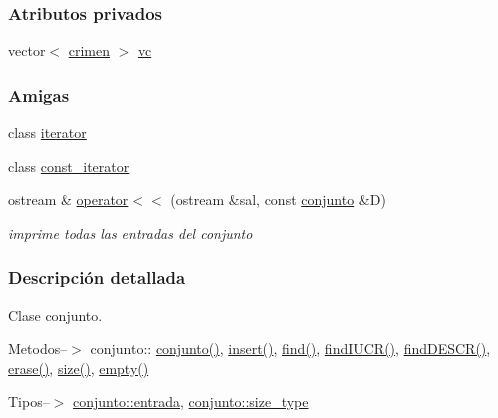 \subsubsection*{Atributos privados}
\begin{DoxyCompactItemize}
\item 
vector$<$ \hyperlink{classcrimen}{crimen} $>$ \hyperlink{classconjunto_aed485e92bb3d8b2c82fc85657947761d}{vc}
\end{DoxyCompactItemize}
\subsubsection*{Amigas}
\begin{DoxyCompactItemize}
\item 
class \hyperlink{classconjunto_a67171474c4da6cc8efe0c7fafefd2b2d}{iterator}
\item 
class \hyperlink{classconjunto_ac220ce1c155db1ac44146c12d178056f}{const\-\_\-iterator}
\item 
ostream \& \hyperlink{classconjunto_ae54b721035471d372f29c0335c42734a}{operator$<$$<$} (ostream \&sal, const \hyperlink{classconjunto}{conjunto} \&D)
\begin{DoxyCompactList}\small\item\em imprime todas las entradas del conjunto \end{DoxyCompactList}\end{DoxyCompactItemize}


\subsubsection{Descripción detallada}
Clase conjunto. 

Metodos--$>$ conjunto\-:\-: \hyperlink{classconjunto_a16d987f42c679efab01748178ba45891}{conjunto()}, \hyperlink{classconjunto_aa65b9f7c4cb9bad6d4e40c1973095930}{insert()}, \hyperlink{classconjunto_a5db0b726eea4bd8163340e0c3e7ab427}{find()}, \hyperlink{classconjunto_a2ca2a7b59bce8369e9d9ccc1c7be9614}{find\-I\-U\-C\-R()}, \hyperlink{classconjunto_afff3e7f4b3d00f422dd7ab2fec935378}{find\-D\-E\-S\-C\-R()}, \hyperlink{classconjunto_ad550177fa4454da3a10fa356417e39a7}{erase()}, \hyperlink{classconjunto_a863e1e106e35adda47e7c5e2067295b9}{size()}, \hyperlink{classconjunto_afcf4ff3ff3c1f83b63e901efebe93533}{empty()}

Tipos--$>$ \hyperlink{classconjunto_a09cad766dd65de73e51eae21f9d22585}{conjunto\-::entrada}, \hyperlink{classconjunto_a855a5893bb0f5a851ab2dbf2b8aa6cc7}{conjunto\-::size\-\_\-type}

